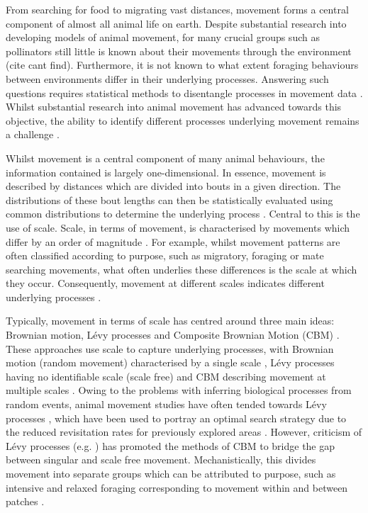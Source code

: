 \documentclass[11pt,usenames,dvipsnames,a4paper]{article}
\begin{document}
\begin{linenumbers}
\hspace{\parindent}
From searching for food to migrating vast distances, movement forms a central component of almost all animal life on earth. Despite substantial research into developing models of animal movement, for many crucial groups such as pollinators still little is known about their movements through the environment (cite cant find). Furthermore, it is not known to what extent foraging behaviours between environments differ in their underlying processes. Answering such questions requires statistical methods to disentangle processes in movement data \citep{Nathan2008}. Whilst substantial research into animal movement has advanced towards this objective, the ability to identify different processes underlying movement remains a challenge \citep{Patterson2017}. 

Whilst movement is a central component of many animal behaviours, the information contained is largely one-dimensional. In essence, movement is described by distances which are divided into bouts in a given direction. The distributions of these bout lengths can then be statistically evaluated using common distributions to determine the underlying process \citep{Murphy2007, Reynolds2018}. Central to this is the use of scale. Scale, in terms of movement, is characterised by movements which differ by an order of magnitude \citep{Levin1992}. For example, whilst movement patterns are often classified according to purpose, such as migratory, foraging or mate searching movements, what often underlies these differences is the scale at which they occur. Consequently, movement at different scales indicates different underlying processes \citep{Nathan2008}. 

Typically, movement in terms of scale has centred around three main ideas: Brownian motion, L\'evy processes and Composite Brownian Motion (CBM) \citep{Nathan2008, Reynolds2018}. These approaches use scale to capture underlying processes, with Brownian motion (random movement) characterised by a single scale \citep{Barthelemy2008}, L\'evy processes having no identifiable scale (scale free) \citep{Viswanathan1999, Barthelemy2008, Reynolds2018} and CBM describing movement at multiple scales \citep{Petrovskii2011, Jansen2012}. Owing to the problems with inferring biological processes from random events, animal movement studies have often tended towards L\'evy processes \citep{Harris2012, Ariel2015, Humphries2010, Baronchelli2013, Boyer, Ayala-Orozco2004, Sims2008, Viswanathan1999}, which have been used to portray an optimal search strategy due to the reduced revisitation rates for previously explored areas \citep{Viswanathan1999, Humphries2014}. However, criticism of L\'evy processes (e.g. \cite{Pyke2015}) has promoted the methods of CBM to bridge the gap between singular and scale free movement. Mechanistically, this divides movement into separate groups which can be attributed to purpose, such as intensive and relaxed foraging corresponding to movement within and between patches \citep{Auger-Methe2015}. 


\end{linenumbers}
\end{document}
